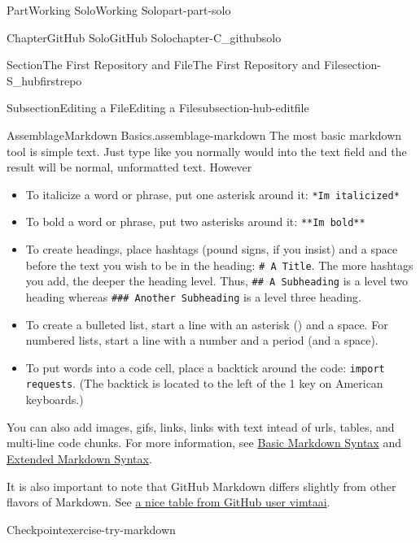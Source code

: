 \documentclass[oneside,10pt,]{book}
\newcommand{\mono}[1]{\texttt{#1}}
\begin{document}
\begin{partptx}{Part}{Working Solo}{}{Working Solo}{}{}{part-part-solo}
\begin{chapterptx}{Chapter}{GitHub Solo}{}{GitHub Solo}{}{}{chapter-C_githubsolo}
\begin{sectionptx}{Section}{The First Repository and File}{}{The First Repository and File}{}{}{section-S_hubfirstrepo}
\begin{subsectionptx}{Subsection}{Editing a File}{}{Editing a File}{}{}{subsection-hub-editfile}
\begin{assemblage}{Assemblage}{Markdown Basics.}{assemblage-markdown}%
The most basic markdown tool is simple text. Just type like you normally would into the text field and the result will be normal, unformatted text. However\textellipsis{}%
\begin{itemize}[label=\textbullet]
\item{}To italicize a word or phrase, put one asterisk around it: \mono{*I\textquotesingle{}m italicized*}%
\item{}To bold a word or phrase, put two asterisks around it: \mono{**I\textquotesingle{}m bold**}%
\item{}To create headings, place hashtags (pound signs, if you insist)  and a space before the text you wish to be in the heading: \mono{\# A Title}. The more hashtags you add, the deeper the heading level. Thus, \mono{\#\# A Subheading} is a level two heading whereas \mono{\#\#\# Another Subheading} is a level three heading.%
\item{}To create a bulleted list, start a line with an asterisk (\textasteriskcentered{}) and a space. For numbered lists, start a line with a number and a period (and a space).%
\item{}To put words into a code cell, place a backtick around the code: \mono{\textasciigrave{}import requests\textasciigrave{}}. (The backtick is located to the left of the 1 key on American keyboards.)%
\end{itemize}
You can also add images, gifs, links, links with text intead of urls, tables, and multi-line code chunks. For more information, see \href{https://www.markdownguide.org/basic-syntax/}{Basic Markdown Syntax}\footnotemark{} and \href{https://www.markdownguide.org/extended-syntax/}{Extended Markdown Syntax}\footnotemark{}.%
\par
It is also important to note that GitHub Markdown differs slightly from other flavors of Markdown. See \href{https://gist.github.com/vimtaai/99f8c89e7d3d02a362117284684baa0f}{a nice table from GitHub user vimtaai}\footnotemark{}.%
\end{assemblage}
%
%
%
\begin{inlineexercise}{Checkpoint}{}{exercise-try-markdown}%
%

\end{inlineexercise}
\end{subsectionptx}
\end{sectionptx}
\end{chapterptx}
\end{partptx}
\end{document}
